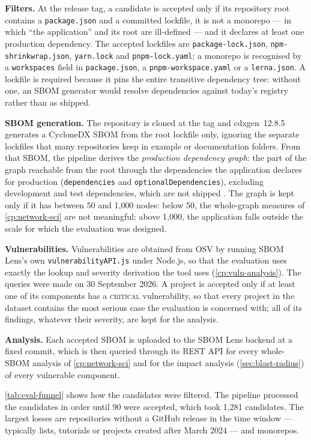 \textbf{Filters.} At the release tag, a candidate is accepted only if its repository root contains a \texttt{package.json} and a committed lockfile, it is not a monorepo --- in which ``the application'' and its root are ill-defined --- and it declares at least one production dependency. The accepted lockfiles are \texttt{package-lock.json}, \texttt{npm-shrinkwrap.json}, \texttt{yarn.lock} and \texttt{pnpm-lock.yaml}; a monorepo is recognised by a \texttt{workspaces} field in \texttt{package.json}, a \texttt{pnpm-workspace.yaml} or a \texttt{lerna.json}. A lockfile is required because it pins the entire transitive dependency tree: without one, an SBOM generator would resolve dependencies against today's registry rather than as shipped.

\textbf{SBOM generation.} The repository is cloned at the tag and cdxgen~12.8.5 generates a CycloneDX SBOM from the root lockfile only, ignoring the separate lockfiles that many repositories keep in example or documentation folders. From that SBOM, the pipeline derives the \textit{production dependency graph}: the part of the graph reachable from the root through the dependencies the application declares for production (\texttt{dependencies} and \texttt{optionalDependencies}), excluding development and test dependencies, which are not shipped \citep{Pashchenko2018}. The graph is kept only if it has between 50 and 1{,}000 nodes: below 50, the whole-graph measures of \autoref{cp:network-sci} are not meaningful; above 1{,}000, the application falls outside the scale for which the evaluation was designed.

\textbf{Vulnerabilities.} Vulnerabilities are obtained from OSV by running SBOM Lens's own \texttt{vulnerabilityAPI.js} under Node.js, so that the evaluation uses exactly the lookup and severity derivation the tool uses (\autoref{cp:vuln-analysis}). The queries were made on 30 September 2026. A project is accepted only if at least one of its components has a \textsc{critical} vulnerability, so that every project in the dataset contains the most serious case the evaluation is concerned with; all of its findings, whatever their severity, are kept for the analysis.

\textbf{Analysis.} Each accepted SBOM is uploaded to the SBOM Lens backend at a fixed commit, which is then queried through its REST API for every whole-SBOM analysis of \autoref{cp:network-sci} and for the impact analysis (\autoref{sec:blast-radius}) of every vulnerable component.

\autoref{tab:eval-funnel} shows how the candidates were filtered. The pipeline processed the candidates in order until 90 were accepted, which took 1{,}281 candidates. The largest losses are repositories without a GitHub release in the time window --- typically lists, tutorials or projects created after March 2024 --- and monorepos.

